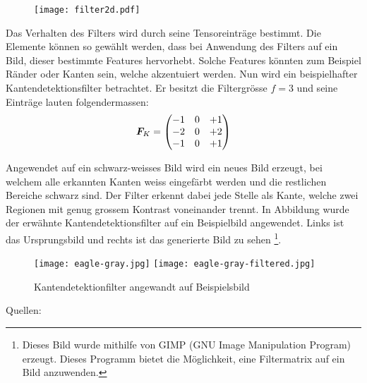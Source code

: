 \begin{figure}[h!]
  \centering
  \texttt{[image: filter2d.pdf]}
  \label{fig:filter2d}
\end{figure}
\para{}
Das Verhalten des Filters wird durch seine Tensoreinträge bestimmt.
Die Elemente können so gewählt werden, dass bei Anwendung des Filters auf
ein Bild, dieser bestimmte Features hervorhebt. Solche Features
könnten zum Beispiel Ränder oder Kanten sein, welche akzentuiert werden.
\para{}
Nun wird ein beispielhafter Kantendetektionsfilter betrachtet. Er besitzt die
Filtergrösse $f=3$ und seine Einträge lauten folgendermassen:
\begin{equation*}
  \bm{F}_K =
  \begin{pmatrix}
    -1 & 0 & +1 \\
    -2 & 0 & +2 \\
    -1 & 0 & +1 \\
  \end{pmatrix}
\end{equation*}

Angewendet auf ein schwarz-weisses Bild wird ein neues Bild erzeugt, bei welchem alle erkannten
Kanten weiss eingefärbt werden und die restlichen Bereiche schwarz sind.
Der Filter erkennt dabei jede Stelle als Kante, welche zwei Regionen mit
genug grossem Kontrast voneinander trennt.
In Abbildung  wurde der erwähnte Kantendetektionsfilter auf ein
Beispielbild angewendet. Links ist das Ursprungsbild und rechts ist das
generierte Bild zu sehen%
\footnote{
  Dieses Bild wurde mithilfe von GIMP (GNU Image Manipulation Program) erzeugt. Dieses
  Programm bietet die Möglichkeit, eine Filtermatrix auf ein Bild anzuwenden.
}.

\begin{figure}[h!]
  \centering
  \texttt{[image: eagle-gray.jpg]}
  \texttt{[image: eagle-gray-filtered.jpg]}
  \caption{Kantendetektionfilter angewandt auf Beispielsbild \cite{res:eagle_image}}
  \label{fig:edge_filter}
\end{figure}

\para{}
Quellen: \cite{deeplearning.ai:cnn} \cite{wiki:kernel} \cite{net:gimp_conv}



